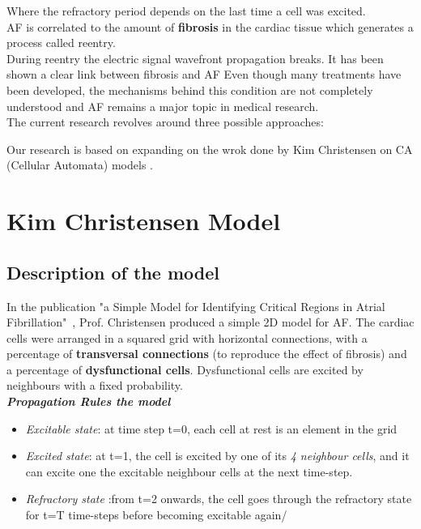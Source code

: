 \documentclass[twocolumn, a1paper, 20pt]{article}
\begin{document}
Where the refractory period depends on the last time a cell was excited.\\



AF is correlated to the amount of \textbf{ fibrosis} in the cardiac tissue which generates a process called reentry. \\
During reentry the electric signal wavefront propagation breaks. It has been shown a clear link between fibrosis and AF
Even though many treatments have been developed, the mechanisms behind this condition are not completely understood and AF remains a major topic in medical research. \\
The current research revolves around three possible approaches:


 
 Our research is based on expanding on the wrok done by Kim Christensen on CA (Cellular Automata) models \cite{Christensen}.




\section{\textbf{Kim Christensen Model}}

\subsection{Description of the model}

In the publication "a Simple Model for Identifying Critical Regions in Atrial Fibrillation"~\cite{Christensen}, Prof. Christensen produced a simple 2D model for AF. The cardiac cells were arranged in a squared grid with horizontal connections, with a percentage of \textbf{ transversal connections} (to reproduce the effect of fibrosis) and a percentage of \textbf{dysfunctional cells}.
Dysfunctional cells are excited by neighbours with a fixed probability.\\

\textbf{\textit{Propagation Rules the model}}\\

\begin{itemize}
  \item \textit{Excitable state}: at time step t=0, each cell at rest is an element in the grid 

  										
  \item \textit{Excited state}: at t=1, the cell is excited by one of its \textit{ 4 neighbour cells}, and it can excite one the excitable neighbour cells at the next time-step.
  \item \textit{Refractory state} :from t=2 onwards, the cell goes through the refractory state for t=T time-steps before becoming excitable again/
\end{itemize}  
\end{document}
